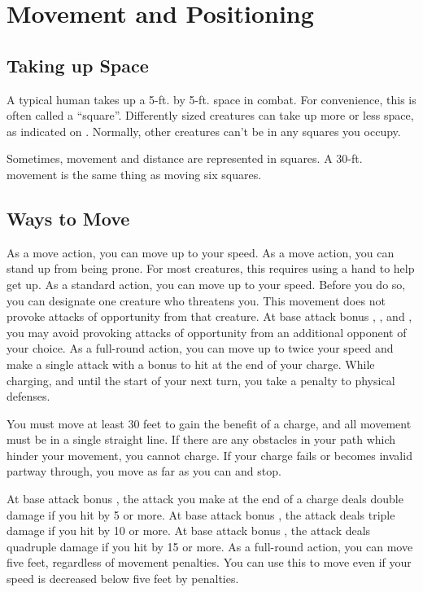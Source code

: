 \section{Movement and Positioning}\label{Movement and Positioning}

\subsection{Taking up Space}
A typical human takes up a 5-ft. by 5-ft. space in combat. For convenience, this is often called a ``square''. Differently sized creatures can take up more or less space, as indicated on . Normally, other creatures can't be in any squares you occupy.

Sometimes, movement and distance are represented in squares. A 30-ft. movement is the same thing as moving six squares.

\subsection{Ways to Move}

 As a move action, you can move up to your speed.
 As a move action, you can stand up from being prone. For most creatures, this requires using a hand to help get up.
\label{Withdraw} As a standard action, you can move up to your speed. Before you do so, you can designate one creature who threatens you. This movement does not provoke attacks of opportunity from that creature. At base attack bonus , , and , you may avoid provoking attacks of opportunity from an additional opponent of your choice.
\label{Charge} As a full-round action, you can move up to twice your speed and make a single attack with a  bonus to hit at the end of your charge. While charging, and until the start of your next turn, you take a  penalty to physical defenses.
\par You must move at least 30 feet to gain the benefit of a charge, and all movement must be in a single straight line. If there are any obstacles in your path which hinder your movement, you cannot charge. If your charge fails or becomes invalid partway through, you move as far as you can and stop.
\par  At base attack bonus , the attack you make at the end of a charge deals double damage if you hit by 5 or more. At base attack bonus , the attack deals triple damage if you hit by 10 or more. At base attack bonus , the attack deals quadruple damage if you hit by 15 or more.
 As a full-round action, you can move five feet, regardless of movement penalties. You can use this to move even if your speed is decreased below five feet by penalties.

